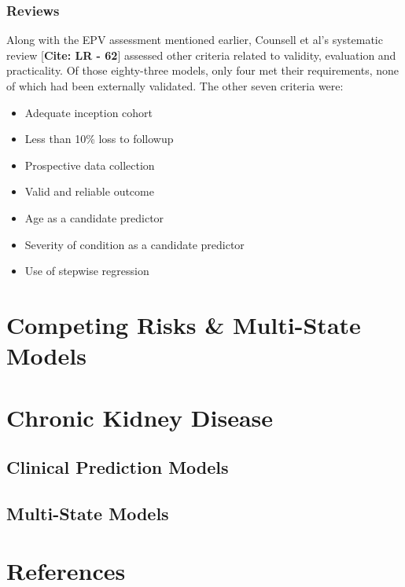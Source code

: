 \documentclass[
]{article}
\providecommand{\tightlist}{%
  \setlength{\itemsep}{0pt}\setlength{\parskip}{0pt}}
\begin{document}
\hypertarget{reviews}{%
\subsubsection{Reviews}\label{reviews}}

Along with the EPV assessment mentioned earlier, Counsell et al's systematic review {[}\textbf{Cite: LR - 62}{]} assessed other criteria related to validity, evaluation and practicality. Of those eighty-three models, only four met their requirements, none of which had been externally validated. The other seven criteria were:
\begin{itemize}
\tightlist
\item
  Adequate inception cohort
\item
  Less than 10\% loss to followup
\item
  Prospective data collection
\item
  Valid and reliable outcome
\item
  Age as a candidate predictor
\item
  Severity of condition as a candidate predictor
\item
  Use of stepwise regression
\end{itemize}
\hypertarget{competing-risks-multi-state-models}{%
\section{Competing Risks \& Multi-State Models}\label{competing-risks-multi-state-models}}

\hypertarget{chronic-kidney-disease}{%
\section{Chronic Kidney Disease}\label{chronic-kidney-disease}}

\hypertarget{clinical-prediction-models-1}{%
\subsection{Clinical Prediction Models}\label{clinical-prediction-models-1}}

\hypertarget{multi-state-models}{%
\subsection{Multi-State Models}\label{multi-state-models}}

\hypertarget{references}{%
\section*{References}\label{references}}
\end{document}
